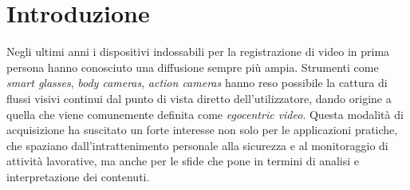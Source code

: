 \chapter{Introduzione}

Negli ultimi anni i dispositivi indossabili per la registrazione di video in prima persona hanno conosciuto una diffusione sempre più ampia. Strumenti come \emph{smart glasses}, \emph{body cameras}, \emph{action cameras} hanno reso possibile la cattura di flussi visivi continui dal punto di vista diretto dell'utilizzatore, dando origine a quella che viene comunemente definita come \emph{egocentric video}. Questa modalità di acquisizione ha suscitato un forte interesse \cite{NUNEZMARCOS2022175} non solo per le applicazioni pratiche, che spaziano dall'intrattenimento personale alla sicurezza e al monitoraggio di attività lavorative, ma anche per le sfide che pone in termini di analisi e interpretazione dei contenuti.

